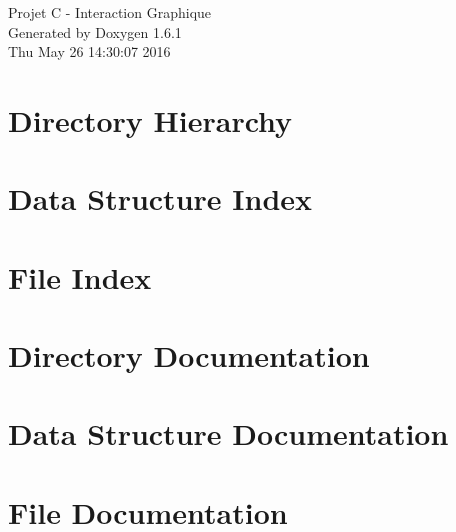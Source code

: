 \documentclass[a4paper]{book}
\begin{document}
\hypersetup{pageanchor=false}
\begin{titlepage}
\vspace*{7cm}
\begin{center}
{\Large Projet C -\/ Interaction Graphique }\\
\vspace*{1cm}
{\large Generated by Doxygen 1.6.1}\\
\vspace*{0.5cm}
{\small Thu May 26 14:30:07 2016}\\
\end{center}
\end{titlepage}
\clearemptydoublepage
{}
\tableofcontents
\clearemptydoublepage
{}
\hypersetup{pageanchor=true}
\chapter{Directory Hierarchy}

\chapter{Data Structure Index}

\chapter{File Index}

\chapter{Directory Documentation}


\chapter{Data Structure Documentation}















\chapter{File Documentation}

















\printindex
\end{document}
